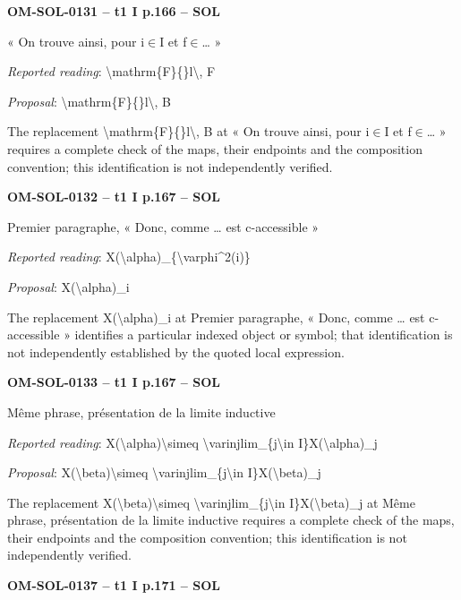 \par\noindent\textbf{OM-SOL-0131 -- t1 I p.166 -- SOL}\par
« On trouve ainsi, pour i\ensuremath{\in}I et f\ensuremath{\in}… »\par
\emph{Reported reading}: \textbackslash{}mathrm\{F\}\{\}l\textbackslash{}, F\par
\emph{Proposal}: \textbackslash{}mathrm\{F\}\{\}l\textbackslash{}, B\par
The replacement \textbackslash{}mathrm\{F\}\{\}l\textbackslash{}, B at « On trouve ainsi, pour i\ensuremath{\in}I et f\ensuremath{\in}… » requires a complete check of the maps, their endpoints and the composition convention; this identification is not independently verified.\par
\par\noindent\textbf{OM-SOL-0132 -- t1 I p.167 -- SOL}\par
Premier paragraphe, « Donc, comme … est c-accessible »\par
\emph{Reported reading}: X(\textbackslash{}alpha)\_\{\textbackslash{}varphi\textasciicircum{}2(i)\}\par
\emph{Proposal}: X(\textbackslash{}alpha)\_i\par
The replacement X(\textbackslash{}alpha)\_i at Premier paragraphe, « Donc, comme … est c-accessible » identifies a particular indexed object or symbol; that identification is not independently established by the quoted local expression.\par
\par\noindent\textbf{OM-SOL-0133 -- t1 I p.167 -- SOL}\par
Même phrase, présentation de la limite inductive\par
\emph{Reported reading}: X(\textbackslash{}alpha)\textbackslash{}simeq \textbackslash{}varinjlim\_\{j\textbackslash{}in I\}X(\textbackslash{}alpha)\_j\par
\emph{Proposal}: X(\textbackslash{}beta)\textbackslash{}simeq \textbackslash{}varinjlim\_\{j\textbackslash{}in I\}X(\textbackslash{}beta)\_j\par
The replacement X(\textbackslash{}beta)\textbackslash{}simeq \textbackslash{}varinjlim\_\{j\textbackslash{}in I\}X(\textbackslash{}beta)\_j at Même phrase, présentation de la limite inductive requires a complete check of the maps, their endpoints and the composition convention; this identification is not independently verified.\par
\par\noindent\textbf{OM-SOL-0137 -- t1 I p.171 -- SOL}\par
